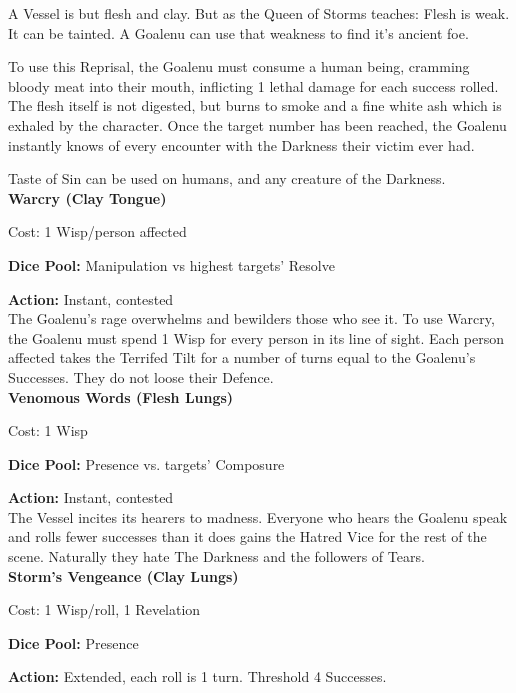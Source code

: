 \noindent A Vessel is but flesh and clay. But as the Queen of Storms teaches: Flesh is weak. It can be tainted. A Goalenu can use that weakness to find it's ancient foe. 

To use this Reprisal, the Goalenu must consume a human being, cramming bloody meat into their mouth, inflicting 1 lethal damage for each success rolled. The flesh itself is not digested, but burns to smoke and a fine white ash which is exhaled by the character. Once the target number has been reached, the Goalenu instantly knows of every encounter with the Darkness their victim ever had. 

Taste of Sin can be used on humans, and any creature of the Darkness. \\

\noindent\textbf{Warcry (Clay Tongue)}

\noindent Cost: 1 Wisp/person affected

\noindent\textbf{Dice Pool:} Manipulation vs highest targets' Resolve

\noindent\textbf{Action:} Instant, contested\\

\noindent The Goalenu's rage overwhelms and bewilders those who see it. To use Warcry, the Goalenu must spend 1 Wisp for every person in its line of sight. Each person affected takes the Terrifed Tilt for a number of turns equal to the Goalenu's Successes. They do not loose their Defence. \\

\noindent\textbf{Venomous Words (Flesh Lungs)}

\noindent Cost: 1 Wisp

\noindent\textbf{Dice Pool:} Presence vs. targets' Composure

\noindent\textbf{Action:} Instant, contested\\

\noindent The Vessel incites its hearers to madness. Everyone who hears the Goalenu speak and rolls fewer successes than it does gains the Hatred Vice for the rest of the scene. Naturally they hate The Darkness and the followers of Tears.\\

\noindent\textbf{Storm’s Vengeance (Clay Lungs)}

\noindent Cost: 1 Wisp/roll, 1 Revelation

\noindent\textbf{Dice Pool:} Presence

\noindent\textbf{Action:} Extended, each roll is 1 turn. Threshold 4 Successes.\\

